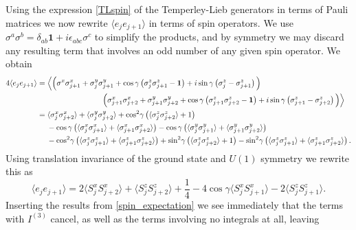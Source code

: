 \documentclass[a4paper,10pt]{article}
\begin{document}
Using the expression \eqref{TLspin} of the Temperley-Lieb generators in terms of Pauli matrices we now rewrite $\langle e_je_{j+1} \rangle$ in terms of spin operators. We use  $\sigma^a\sigma^b = \delta_{ab}\mathbf{1}+i\epsilon_{abc}\sigma^c$ to simplify the products, and by symmetry we may discard any resulting term that involves an odd number of any given spin operator. We obtain
\begin{equation}
\begin{split}
4 \langle e_j  e_{j+1} \rangle &= \Big\langle \Big(
\sigma^x \sigma_{j+1}^x + \sigma_j^y \sigma_{j+1}^y + \cos \gamma \left( \sigma_j^z \sigma_{j+1}^z - \mathbf{1} \right) + i \sin\gamma \left( \sigma_j^z - \sigma_{j+1}^z \right)  
\Big)\\
& \hspace*{3cm}
\Big(
\sigma_{j+1}^x \sigma_{j+2}^x + \sigma_{j+1}^y \sigma_{j+2}^y + \cos \gamma \left( \sigma_{j+1}^z \sigma_{j+2}^z -  \mathbf{1} \right) + i \sin\gamma \left( \sigma_{j+1}^z - \sigma_{j+2}^z \right) 
\Big) \Big\rangle \\
&= 
%
%
\langle \sigma_j^x \sigma_{j+2}^x \rangle +\langle \sigma_j^y \sigma_{j+2}^y \rangle + \cos^2\!\gamma \left( \langle \sigma_j^z \sigma_{j+2}^z \rangle +1 \right)\\
&\quad\;
%
%
- \cos\gamma  \left( \langle \sigma_j^x \sigma_{j+1}^x \rangle 
+\langle \sigma_{j+1}^x \sigma_{j+2}^x \rangle \right) 
- \cos\gamma  \left( \langle \sigma_j^y \sigma_{j+1}^y \rangle 
+\langle \sigma_{j+1}^y \sigma_{j+2}^y \rangle \right) 
%
\\
&\quad\;
-\cos^2\!\gamma \left(  \langle \sigma_j^z \sigma_{j+1}^z \rangle 
+\langle \sigma_{j+1}^z \sigma_{j+2}^z \rangle   \right)
+ \sin^2\!\gamma \left( \langle \sigma_j^z \sigma_{j+2}^z \rangle +1  \right)
- \sin^2\!\gamma \left(  \langle \sigma_j^z \sigma_{j+1}^z \rangle 
+\langle \sigma_{j+1}^z \sigma_{j+2}^z \rangle   \right).
\end{split}
\end{equation}
Using translation invariance of the ground state and $U(1)$ symmetry we rewrite this as
\begin{equation}\label{TLprod}
\langle e_j e_{j+1} \rangle  =2 \langle S_j^x S_{j+2}^x\rangle + \langle S_j^z S_{j+2}^z\rangle  + \frac{1}{4}    -4 \cos\gamma  \langle S_j^x S_{j+1}^x \rangle- 2  \langle S_j^z S_{j+1}^z\rangle.
\end{equation}
Inserting the results from \eqref{spin_expectation} we see immediately that the terms with $I^{(3)}$ cancel, as well as the terms involving no integrals at all, leaving
\end{document}
